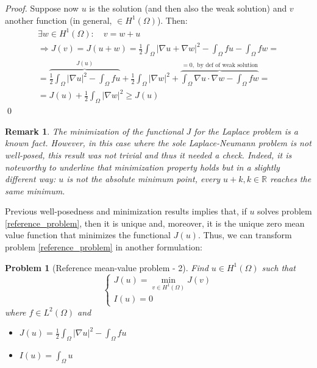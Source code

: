 \documentclass[a4paper,11pt]{article}
\newtheorem{problem}{Problem}
\newtheorem*{remark}{Remark}
\begin{document}
\begin{proof}
     \noindent Suppose now $u$ is the solution (and then also the weak solution) and $v$ another function (in general, $\in H^1(\Omega)$). Then:
     \begin{equation*}
     \begin{gathered}
     \exists w \in H^1(\Omega): \quad v = w+u \\
     \Rightarrow J(v)=J(u+w)= \frac{1}{2}\int_{\Omega}|\nabla u + \nabla w|^2 - \int_{\Omega}{fu}- \int_{\Omega}{fw} = \\
     = \overbrace{\frac{1}{2}\int_{\Omega}|\nabla u|^2 - \int_{\Omega}{fu}}^{J(u)} + \frac{1}{2}\int_{\Omega}|\nabla w|^2 + \overbrace{\int_{\Omega}\nabla u \cdot \nabla w - \int_{\Omega}{fw}}^{=0, \text { by def of weak solution}} =\\
     = J(u) + \frac{1}{2}\int_{\Omega}|\nabla w| ^2 \geq J(u)
     \end{gathered}
     \end{equation*}
     \qed
\end{proof}

\begin{remark}
	The minimization of the functional $J$ for the Laplace problem is a known fact. However, in this case where the sole Laplace-Neumann problem is not well-posed, this result was not trivial and thus it needed a check. Indeed, it is noteworthy to underline that minimization property holds but in a slightly different way: $u$ is not the absolute minimum point, every $u+k, k\in\mathbb{R}$ reaches the same minimum.
\end{remark}

\noindent Previous well-posedness and minimization results implies that, if $u$ solves problem \ref{reference_problem}, then it is unique and, moreover, it is the unique zero mean value function that minimizes the functional $J(u)$. Thus, we can transform problem \ref{reference_problem} in another formulation:

\begin{problem}[Reference mean-value problem - 2] \label{reference_problem_2} Find $u\in H^1(\Omega)$ such that
	\begin{equation*}
	\begin{cases}
	J(u)=\displaystyle \min_{v\in H^1(\Omega)} J(v)\\
	I(u) = 0
	\end{cases}
	\end{equation*}
 where $f\in L^2(\Omega)$ and  \vspace{2mm}
	\begin{itemize}
		\item $J(u) = \frac{1}{2}\int_{\Omega} |\nabla u |^2 - \int_{\Omega}fu$
		\item $I(u) = \int_{\Omega} u $
	\end{itemize}
\end{problem}
\end{document}
